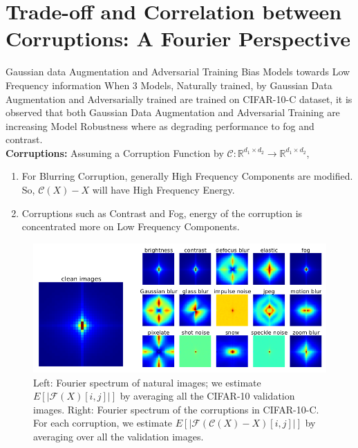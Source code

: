 \documentclass[8pt]{beamer}
\begin{document}
\section{Trade-off and Correlation between Corruptions: A Fourier Perspective}
\begin{frame}[allowframebreaks]{Gaussian data Augmentation and Adversarial Training Bias Models towards Low Frequency information}
\qquad When 3 Models, Naturally trained, by Gaussian Data Augmentation and Adversarially trained are trained on CIFAR-10-C dataset, it is observed that both Gaussian Data Augmentation and Adversarial Training are increasing Model Robustness where as degrading performance to fog and contrast.\\

\textbf{Corruptions:}
Assuming a Corruption Function by $\mathcal{C}:\mathbb{R}^{d_1 \times d_2} \to \mathbb{R}^{d_1 \times d_2}$,
\begin{enumerate}
    \item For Blurring Corruption, generally High Frequency Components are modified. So, $\mathcal{C}(X) - X$ will have High Frequency Energy.
    \item Corruptions such as Contrast and Fog, energy of the corruption is concentrated more on Low Frequency Components.
\end{enumerate}
\framebreak
\begin{figure}
    \centering
    \includegraphics[scale=0.35]{../Images/Augmentation.png}
    \caption{Left: Fourier spectrum of natural images; we estimate $E[|\mathcal{F}(X)[i, j]|]$ by averaging all the CIFAR-10 validation images. Right: Fourier spectrum of the corruptions in CIFAR-10-C. For each corruption, we estimate $E[|\mathcal{F}(\mathcal{C}(X) - X)[i, j]|]$ by averaging over all the validation images.}
\end{figure}
\end{frame}
\end{document}
